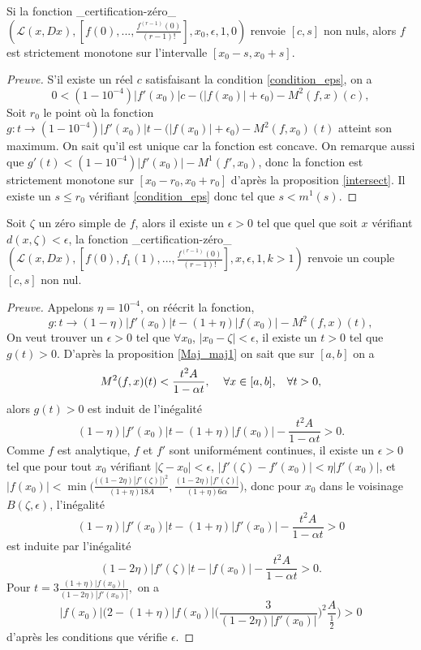 \documentclass[a4paper,10pt]{article}
\begin{document}
	\begin{proposition}
		Si la fonction \_certification-zéro\_$(\mathcal{L}(x,Dx),[f(0),...,\frac{f^{(r-1)}(0)}{(r-1)!}],x_0,\epsilon,1,0)$ renvoie $[c,s]$ non nuls, alors $f$ est strictement monotone sur l'intervalle $[x_0-s,x_0+s]$.
	\end{proposition}
	\begin{proof}[Preuve]
		S'il existe un réel $c$ satisfaisant la condition \eqref{condition_eps}, on a 
		\[0<(1-10^{-4})|f'(x_0)|c-\big(|f(x_0)|+\epsilon_0\big)-M^2(f,x)(c),\]
		Soit $r_0$ le point où la fonction $g:t \rightarrow (1-10^{-4})|f'(x_0)|t-\big(|f(x_0)|+\epsilon_0\big)-M^2(f,x_0)(t)$ atteint son maximum. On sait qu'il est unique car la fonction est concave. On remarque aussi que $g'(t)<(1-10^{-4})|f'(x_0)|-M^1(f',x_0)$, donc la fonction est strictement monotone sur $[x_0-r_0,x_0+r_0]$ d'après la proposition \ref{intersect}. Il existe un $s\leq r_0$ vérifiant \eqref{condition_eps} donc tel que $s<m^1(s)$.
	\end{proof}
	\begin{proposition}
		Soit $\zeta$ un zéro simple de $f$, alors il existe un $\epsilon>0$ tel que quel que soit $x$ vérifiant $d(x,\zeta)<\epsilon$, la fonction \_certification-zéro\_$(\mathcal{L}(x,Dx),[f(0),f_{1}(1),...,\frac{f^{(r-1)}(0)}{(r-1)!}],x,\epsilon,1,k>1)$ renvoie un couple $[c,s]$ non nul. 
		\label{certification_eps}
	\end{proposition}
	\begin{proof}[Preuve]
		 Appelons $\eta=10^{-4}$, on réécrit la fonction,
		 \begin{equation}
		 	g: t \rightarrow (1-\eta)|f'(x_0)|t-(1+\eta)|f(x_0)|-M^2(f,x)(t),
		 	\label{**}
		 \end{equation}
		On veut trouver un $\epsilon>0$ tel que $\forall x_0$, $|x_0-\zeta|<\epsilon$, il existe un $t>0$ tel que $g(t)>0$.
		D'après la proposition \ref{Maj_maj1} on sait que sur $[a,b]$ on a
		\[M^2(f,x)(t)<\frac{t^2A}{1-\alpha t}, \hspace{4mm} \forall x \in [a,b], \hspace{3mm} \forall t>0,\]
		alors $g(t)>0$ est induit de l'inégalité
		\[(1-\eta)|f'(x_0)|t-(1+\eta)|f(x_0)|-\frac{t^2 A}{1-\alpha t}>0.\]
		Comme $f$ est analytique, $f$ et $f'$ sont uniformément continues, il existe un $\epsilon>0$ tel que pour tout $x_0$ vérifiant $|\zeta-x_0|<\epsilon$, $|f'(\zeta)-f'(x_0)|<\eta|f'(x_0)|$, et $|f(x_0)|<\min\Big(\frac{\big((1-2\eta)|f'(\zeta)|\big)^2}{(1+\eta)18A},\frac{(1-2\eta)|f'(\zeta)|}{(1+\eta)6\alpha} \Big)$, donc pour $x_0$ dans le voisinage $B(\zeta,\epsilon)$, l'inégalité
		\[(1-\eta)|f'(x_0)|t-(1+\eta)|f'(x_0)|-\frac{t^2 A}{1-\alpha t}>0\]
		 est induite par l'inégalité
		\[(1-2\eta)|f'(\zeta)|t-|f(x_0)|-\frac{t^2 A}{1-\alpha t}>0.\]
		Pour $t=3\frac{(1+\eta)|f(x_0)|}{(1-2\eta)|f'(x_0)|},$ on a 
		\[|f(x_0)|\Big(2-(1+\eta)|f(x_0)|\Big(\frac{3}{(1-2\eta)|f'(x_0)|}\Big)^{2}\frac{A}{\frac{1}{2}}\Big)>0\]
		d'après les conditions que vérifie $\epsilon$. 
	\end{proof}
	
\end{document}
